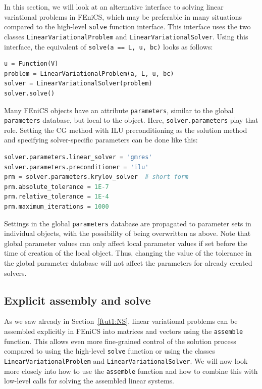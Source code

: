 \documentclass[graybox,envcountchap,sectrefs,final]{svmonodo}
\begin{document}
In this section, we will look at an alternative interface to solving
linear variational problems in FEniCS, which may be preferable in
many situations compared to the high-level \texttt{solve} function interface.
This interface uses the two classes \texttt{LinearVariationalProblem} and
\texttt{LinearVariationalSolver}. Using this interface, the equivalent of
\texttt{solve(a == L, u, bc)} looks as follows:

\begin{lstlisting}[language=Python,style=graycolor]
u = Function(V)
problem = LinearVariationalProblem(a, L, u, bc)
solver = LinearVariationalSolver(problem)
solver.solve()
\end{lstlisting}

Many FEniCS objects have an attribute \texttt{parameters}, similar to
the global \texttt{parameters} database,
but local to the object. Here, \texttt{solver.parameters} play that
role. Setting the CG method with ILU preconditioning as the solution
method and specifying solver-specific parameters can be done
like this:

\begin{lstlisting}[language=Python,style=graycolor]
solver.parameters.linear_solver = 'gmres'
solver.parameters.preconditioner = 'ilu'
prm = solver.parameters.krylov_solver  # short form
prm.absolute_tolerance = 1E-7
prm.relative_tolerance = 1E-4
prm.maximum_iterations = 1000
\end{lstlisting}
Settings in the global \texttt{parameters} database are
propagated to parameter sets in individual objects, with the
possibility of being overwritten as above. Note that global parameter
values can only affect local parameter values if set before the time
of creation of the local object. Thus, changing the value of the
tolerance in the global parameter database will not affect the
parameters for already created solvers.

\subsection{Explicit assembly and solve}
\label{ch:poisson0:linalg}


As we saw already in Section~\ref{ftut1:NS}, linear variational
problems can be assembled explicitly in FEniCS into matrices and
vectors using the \texttt{assemble} function. This allows even more
fine-grained control of the solution process compared to using the
high-level \texttt{solve} function or using the classes
\texttt{LinearVariationalProblem} and
\texttt{LinearVariationalSolver}. We will now look more closely into how to
use the \texttt{assemble} function and how to combine this with low-level
calls for solving the assembled linear systems.
\end{document}
